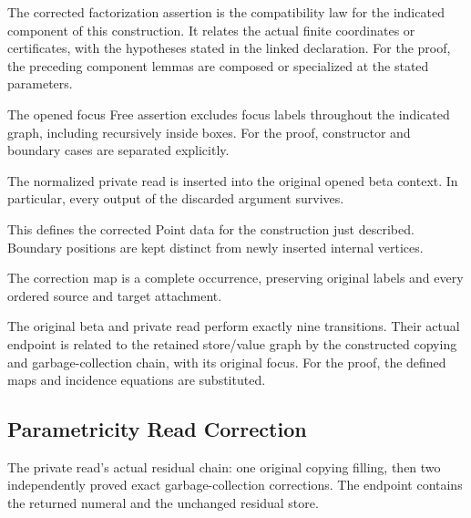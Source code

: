 The corrected factorization assertion is the compatibility law for the indicated component of this construction. It relates the actual finite coordinates or certificates, with the hypotheses stated in the linked declaration.
For the proof, the preceding component lemmas are composed or specialized at the stated parameters.
\par{}

The opened focus Free assertion excludes focus labels throughout the indicated graph, including recursively inside boxes.
For the proof, constructor and boundary cases are separated explicitly.
\par{}

The normalized private read is inserted into the original opened beta context. In particular, every output of the discarded argument survives.
\par{}

This defines the corrected Point data for the construction just described. Boundary positions are kept distinct from newly inserted internal vertices.
\par{}

The correction map is a complete occurrence, preserving original labels and every ordered source and target attachment.
\par{}

The original beta and private read perform exactly nine transitions. Their actual endpoint is related to the retained store/value graph by the constructed copying and garbage-collection chain, with its original focus.
For the proof, the defined maps and incidence equations are substituted.
\par{}

\subsection{Parametricity Read Correction}
The private read's actual residual chain: one original copying filling, then two independently proved exact garbage-collection corrections. The endpoint contains the returned numeral and the unchanged residual store.


